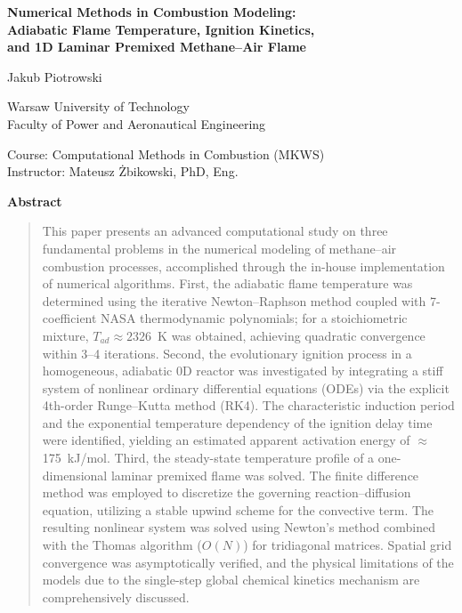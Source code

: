 \documentclass[11pt,a4paper]{article}
\begin{document}
\begin{center}
  {\LARGE\bfseries Numerical Methods in Combustion Modeling:\\[4pt]
  Adiabatic Flame Temperature, Ignition Kinetics,\\ and 1D Laminar Premixed
  Methane--Air Flame\par}
  \vspace{1.4cm}
  {\large Jakub Piotrowski\par}
  \vspace{0.6cm}
  {\normalsize Warsaw University of Technology\\
  Faculty of Power and Aeronautical Engineering\par}
  \vspace{0.4cm}
  {\normalsize Course: Computational Methods in Combustion (MKWS)\\
  Instructor: Mateusz Żbikowski, PhD, Eng.\par}
  \vspace{0.4cm}
  {\normalsize \the\year\par}
\end{center}
\vspace{0.8cm}

\begin{center}\textbf{Abstract}\end{center}
\begin{quotation}
\noindent
This paper presents an advanced computational study on three fundamental problems
in the numerical modeling of methane--air combustion processes, accomplished through the
in-house implementation of numerical algorithms. First, the adiabatic flame temperature
was determined using the iterative Newton--Raphson method coupled with 7-coefficient NASA
thermodynamic polynomials; for a stoichiometric mixture, $T_{ad}\approx 2326$~K was obtained,
achieving quadratic convergence within 3--4 iterations. Second, the evolutionary ignition process
in a homogeneous, adiabatic 0D reactor was investigated by integrating a stiff system of
nonlinear ordinary differential equations (ODEs) via the explicit 4th-order Runge--Kutta method (RK4).
The characteristic induction period and the exponential temperature dependency of the ignition
delay time were identified, yielding an estimated apparent activation energy of $\approx$175~kJ/mol.
Third, the steady-state temperature profile of a one-dimensional laminar premixed flame was solved.
The finite difference method was employed to discretize the governing reaction--diffusion equation,
utilizing a stable upwind scheme for the convective term. The resulting nonlinear system was solved
using Newton's method combined with the Thomas algorithm ($O(N)$) for tridiagonal matrices. Spatial grid
convergence was asymptotically verified, and the physical limitations of the models due to the
single-step global chemical kinetics mechanism are comprehensively discussed.
\end{quotation}
\end{document}
